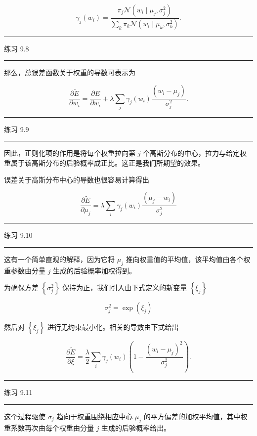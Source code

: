 \documentclass[10pt]{article}
\newcommand{\HRule}{\begin{center}\rule{0.9\linewidth}{0.2mm}\end{center}}
\begin{document}
\[
{\gamma }_{j}\left( {w}_{i}\right)  = \frac{{\pi }_{j}\mathcal{N}\left( {{w}_{i} \mid  {\mu }_{j},{\sigma }_{j}^{2}}\right) }{\mathop{\sum }\limits_{k}{\pi }_{k}\mathcal{N}\left( {{w}_{i} \mid  {\mu }_{k},{\sigma }_{k}^{2}}\right) }. \tag{9.24}
\]

\HRule

练习 9.8

\HRule

那么，总误差函数关于权重的导数可表示为

\[
\frac{\partial \widetilde{E}}{\partial {w}_{i}} = \frac{\partial E}{\partial {w}_{i}} + \lambda \mathop{\sum }\limits_{j}{\gamma }_{j}\left( {w}_{i}\right) \frac{\left( {w}_{i} - {\mu }_{j}\right) }{{\sigma }_{j}^{2}}. \tag{9.25}
\]

\HRule

练习 9.9

\HRule

因此，正则化项的作用是将每个权重拉向第 \(j\) 个高斯分布的中心，拉力与给定权重属于该高斯分布的后验概率成正比。这正是我们所期望的效果。

误差关于高斯分布中心的导数也很容易计算得出

\[
\frac{\partial \widetilde{E}}{\partial {\mu }_{j}} = \lambda \mathop{\sum }\limits_{i}{\gamma }_{j}\left( {w}_{i}\right) \frac{\left( {\mu }_{j} - {w}_{i}\right) }{{\sigma }_{j}^{2}} \tag{9.26}
\]

\HRule

练习 9.10

\HRule

这有一个简单直观的解释，因为它将 \({\mu }_{j}\) 推向权重值的平均值，该平均值由各个权重参数由分量 \(j\) 生成的后验概率加权得到。

为确保方差 \(\left\{  {\sigma }_{j}^{2}\right\}\) 保持为正，我们引入由下式定义的新变量 \(\left\{  {\xi }_{j}\right\}\)

\[
{\sigma }_{j}^{2} = \exp \left( {\xi }_{j}\right)  \tag{9.27}
\]

然后对 \(\left\{  {\xi }_{j}\right\}\) 进行无约束最小化。相关的导数由下式给出

\[
\frac{\partial \widetilde{E}}{\partial \xi } = \frac{\lambda }{2}\mathop{\sum }\limits_{i}{\gamma }_{j}\left( {w}_{i}\right) \left( {1 - \frac{{\left( {w}_{i} - {\mu }_{j}\right) }^{2}}{{\sigma }_{j}^{2}}}\right) . \tag{9.28}
\]

\HRule

练习 9.11

\HRule

这个过程驱使 \({\sigma }_{j}\) 趋向于权重围绕相应中心 \({\mu }_{j}\) 的平方偏差的加权平均值，其中权重系数再次由每个权重由分量 \(j\) 生成的后验概率给出。
\end{document}
